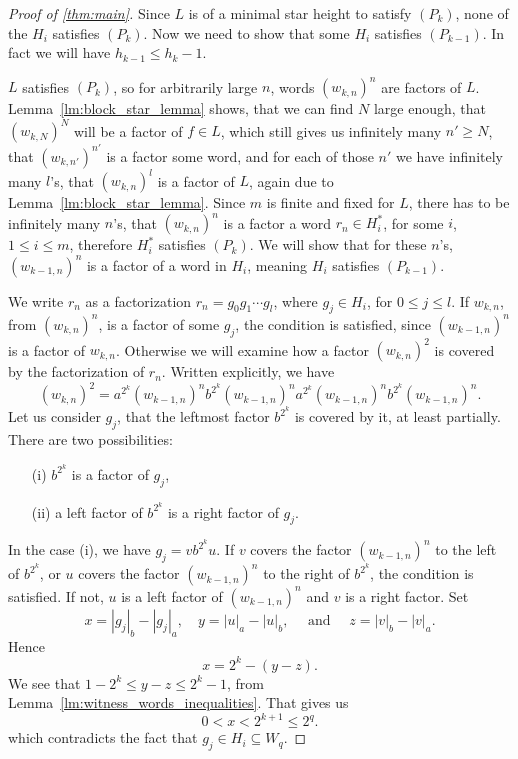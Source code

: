 \begin{proof}[Proof of \autoref*{thm:main}]
    Since $L$ is of a minimal star height to satisfy $(P_k)$, none of the $H_i$ satisfies $(P_k)$. Now we need to show that some $H_i$ satisfies $(P_{k-1})$. In fact we will have $h_{k-1} \leq h_k - 1$.

    $L$ satisfies $(P_k)$, so for arbitrarily large $n$, words ${(w_{k,n})}^n$ are factors of $L$.  Lemma~\ref*{lm:block_star_lemma} shows, that we can find $N$ large enough, that ${(w_{k,N})}^N$ will be a factor of $f \in L$, which still gives us infinitely many $n' \geq N$, that ${(w_{k,n'})}^{n'}$ is a factor some word, and for each of those $n'$ we have infinitely many $l$'s, that ${(w_{k,n})}^l$ is a factor of $L$, again due to Lemma~\ref*{lm:block_star_lemma}. Since $m$ is finite and fixed for $L$, there has to be infinitely many $n$'s, that ${(w_{k,n})}^n$ is a factor a word $r_n \in H_i^*$, for some $i$, $1 \leq i \leq m$, therefore $H_i^*$ satisfies $(P_k)$. We will show that for these $n$'s, ${(w_{k-1,n})}^n$ is a factor of a word in $H_i$, meaning $H_i$ satisfies $(P_{k-1})$.

    We write $r_n$ as a factorization $r_n = g_0 g_1 \dotsm g_l$, where $g_j \in H_i$, for $0 \leq j \leq l$. If $w_{k,n}$, from ${(w_{k,n})}^n$, is a factor of some $g_j$, the condition is satisfied, since ${(w_{k-1,n})}^n$ is a factor of $w_{k,n}$. Otherwise we will examine how a factor ${(w_{k,n})}^2$ is covered by the factorization of $r_n$. Written explicitly, we have
    \[
        {(w_{k,n})}^2 = a^{2^k}{(w_{k-1,n})}^{n}b^{2^k}{(w_{k-1,n})}^{n}a^{2^k}{(w_{k-1,n})}^{n}b^{2^k}{(w_{k-1,n})}^{n}.
    \]
    Let us consider $g_j$, that the leftmost factor $b^{2^k}$ is covered by it, at least partially. There are two possibilities:
    \begin{enumerate}
        \item[(i)] $b^{2^k}$ is a factor of $g_j$,
        \item[(ii)] a left factor of $b^{2^k}$ is a right factor of $g_j$.
    \end{enumerate}

    In the case (i), we have $g_j = v b^{2^k} u$. If $v$ covers the factor ${(w_{k-1,n})}^{n}$ to the left of $b^{2^k}$, or $u$ covers the factor ${(w_{k-1,n})}^{n}$ to the right of $b^{2^k}$, the condition is satisfied. If not, $u$ is a left factor of ${(w_{k-1,n})}^{n}$ and $v$ is a right factor. Set
    \[
        x = |g_j|_b - |g_j|_a, \quad y = |u|_a - |u|_b, \quad \text{ and } \quad z = |v|_b - |v|_a.
    \]
    Hence
    \[
        x = 2^k - (y - z).
    \]
    We see that $1 - 2^k \leq y - z \leq 2^k - 1$, from Lemma~\ref*{lm:witness_words_inequalities}. That gives us
    \[
        0 < x < 2^{k+1} \leq 2^q.
    \]
    which contradicts the fact that $g_j \in H_i \subseteq W_q$.


\end{proof}
